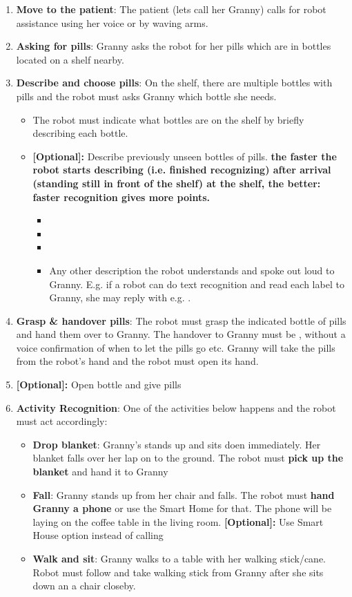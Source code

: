 \begin{enumerate}
	\item \textbf{Move to the patient}: The patient (lets call her Granny) calls for robot assistance using her voice or by waving arms.
	\item \textbf{Asking for pills}: Granny asks the robot for her pills which are in bottles located on a shelf nearby. 
	\item \textbf{Describe and choose pills}: On the shelf, there are multiple bottles with pills and the robot must asks Granny which bottle she needs.
	\begin{itemize}
		\item The robot must indicate what bottles are on the shelf by briefly describing each bottle.
		\item \textbf{[Optional]:} Describe previously unseen bottles of pills. 
		\textbf{the faster the robot starts describing (i.e. finished recognizing) after arrival (standing still in front of the shelf) at the shelf, the better: faster recognition gives more points. }
		\begin{itemize}
 			\item {}
  			\item {}
  			\item {}
  			\item Any other description the robot understands and spoke out loud to Granny. E.g. if a robot can do text recognition and read each label to Granny, she may reply with e.g. .
 		\end{itemize}
 	\end{itemize}
 	\item \textbf{Grasp \& handover pills}: The robot must grasp the indicated bottle of pills and hand them over to Granny. The handover to Granny must be , without a voice confirmation of when to let the pills go etc. Granny will take the pills from the robot's hand and the robot must open its hand.
 	\item \textbf{[Optional]:} Open bottle and give pills
 	\item \textbf{Activity Recognition}: One of the activities below happens and the robot must act accordingly:
 	\begin{itemize}
 		\item \textbf{Drop blanket}: Granny's stands up and sits doen immediately. Her blanket falls over her lap on to the ground. The robot must \textbf{pick up the blanket} and hand it to Granny
 		\item \textbf{Fall}: Granny stands up from her chair and falls. The robot must \textbf{hand Granny a phone} or use the Smart Home for that. 
								The phone will be laying on the coffee table in the living room.
								\textbf{[Optional]:} Use Smart House option instead of calling
 		\item \textbf{Walk and sit}: Granny walks to a table with her walking stick/cane. Robot must follow and take walking stick from Granny after she sits down an a chair closeby.
 	\end{itemize}
\end{enumerate}


